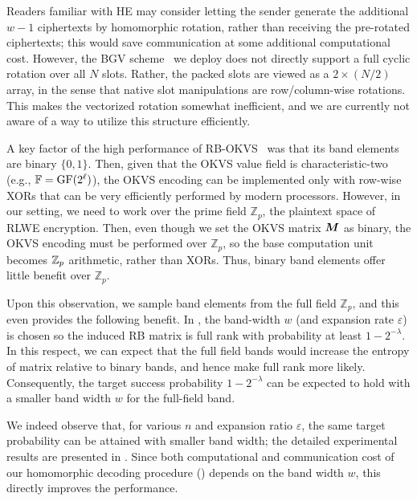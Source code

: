 Readers familiar with HE may consider letting the sender generate the additional $w-1$ ciphertexts by homomorphic rotation, rather than receiving the pre-rotated ciphertexts; this would save communication at some additional computational cost.
However, the BGV scheme~\cite{BGV14} we deploy does not directly support a full cyclic rotation over all \(N\) slots. Rather, the packed slots are viewed as a \(2 \times (N/2)\) array, in the sense that native slot manipulations are row/column-wise rotations. This makes the vectorized rotation somewhat inefficient, and we are currently not aware of a way to utilize this structure efficiently.


A key factor of the high performance of RB-OKVS~\cite{BPSY23} was that its band elements are binary $\{0,1\}$. Then, given that the OKVS value field is characteristic-two (e.g., $\mathbb{F}=\mathrm{GF}(2^{\ell})$), the OKVS encoding can be implemented only with row-wise XORs that can be very efficiently performed by modern processors. However, in our setting, we need to work over the prime field $\mathbb{Z}_p$, the plaintext space of RLWE encryption. Then, even though we set the OKVS matrix $\bm{M}$ as binary, the OKVS encoding must be performed over $\mathbb{Z}_p$, so the base computation unit becomes $\mathbb{Z}_p$ arithmetic, rather than XORs. Thus, binary band elements offer little benefit over $\mathbb{Z}_p$. 

Upon this observation, we sample band elements from the full field $\mathbb{Z}_p$, and this even provides the following benefit. In \cite{BPSY23}, the band-width $w$ (and expansion rate $\varepsilon$) is chosen so the induced RB matrix is full rank with probability at least $1-2^{-\lambda}$.
In this respect, we can expect that the full field bands would increase the entropy of matrix relative to binary bands, and hence make full rank more likely.
Consequently, the target success probability $1 - 2^{-\lambda}$ can be expected to hold with a smaller band width $w$ for the full-field band.

We indeed observe that, for various $n$ and expansion ratio $\varepsilon$, the same target probability can be attained with smaller band width; the detailed experimental results are presented in . Since both computational and communication cost of our homomorphic decoding procedure () depends on the band width $w$, this directly improves the performance.

